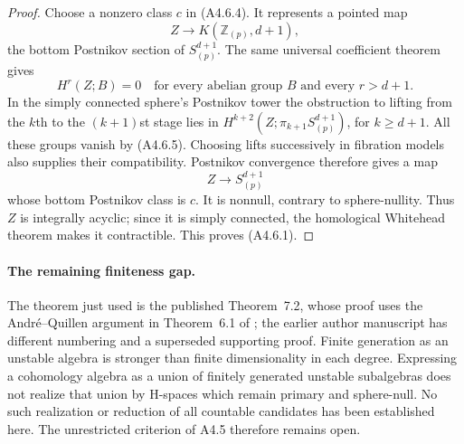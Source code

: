 \begin{proof}
Choose a nonzero class $c$ in \textup{(A4.6.4)}.  It represents
a pointed map
\[
                 Z\longrightarrow K(\mathbb Z_{(p)},d+1),
\]
the bottom Postnikov section of $S^{d+1}_{(p)}$.
The same universal coefficient theorem gives
\[
 H^r(Z;B)=0\quad\text{for every abelian group }B
                   \text{ and every }r>d+1.
 \tag{A4.6.5}
\]
In the simply connected sphere's Postnikov tower the obstruction
to lifting from the $k$th to the $(k+1)$st stage lies in
$H^{k+2}(Z;\pi_{k+1}S^{d+1}_{(p)})$, for $k\geq d+1$.
All these groups vanish by \textup{(A4.6.5)}.  Choosing lifts
successively in fibration models also supplies their compatibility.
Postnikov convergence therefore gives a map
\[
                         Z\longrightarrow S^{d+1}_{(p)}
 \tag{A4.6.6}
\]
whose bottom Postnikov class is $c$.  It is nonnull, contrary
to sphere-nullity.  Thus $Z$ is integrally acyclic; since it is
simply connected, the homological Whitehead theorem makes it
contractible.  This proves \textup{(A4.6.1)}.
\end{proof}

\paragraph{The remaining finiteness gap.}
The theorem just used is the published Theorem~7.2, whose proof
uses the Andr\'e--Quillen argument in Theorem~6.1 of
\citet{A4CCSDeconstruct2007}; the earlier author manuscript has
different numbering and a superseded supporting proof.
Finite generation as an unstable algebra is stronger than
finite dimensionality in each degree.  Expressing a cohomology
algebra as a union of finitely generated unstable subalgebras
does not realize that union by H-spaces which remain primary
and sphere-null.  No such realization or reduction of all
countable candidates has been established here.  The unrestricted
criterion of A4.5 therefore remains open.

